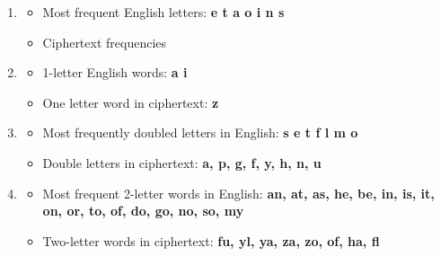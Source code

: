 \documentclass{article}
\begin{document}
\begin{enumerate}
    \item
        \begin{itemize}
            \item Most frequent English letters: \textbf{e t a o i n s}
            \item Ciphertext frequencies
                \begin{figure}[!h]
                \end{figure}
        \end{itemize}
    \item
        \begin{itemize}
            \item 1-letter English words: \textbf{a i}
            \item One letter word in ciphertext: \textbf{z}
        \end{itemize}
    \item
        \begin{itemize}
            \item Most frequently doubled letters in English: \textbf{s e t f l m o}
            \item Double letters in ciphertext: \textbf{a, p, g, f, y, h, n, u}
        \end{itemize}
    \item
        \begin{itemize}
            \item Most frequent 2-letter words in English: \textbf{an, at, as, he, be, in, is, it, on, or, to, of, do, go, no, so, my}
            \item Two-letter words in ciphertext: \textbf{fu, yl, ya, za, zo, of, ha, fl}
        \end{itemize}

\end{enumerate}
\end{document}
